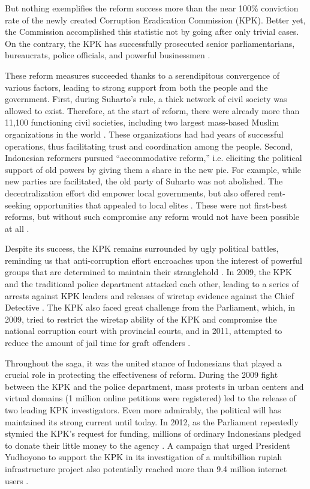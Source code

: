 \documentclass[12pt]{article}
\begin{document}
But nothing exemplifies the reform success more than the near 100\% conviction rate of the newly created Corruption Eradication Commission (KPK). Better yet, the Commission accomplished this statistic not by going after only trivial cases. On the contrary, the KPK has successfully prosecuted senior parliamentarians, bureaucrats, police officials, and powerful businessmen \citep{Schutte2012}.

These reform measures succeeded thanks to a serendipitous convergence of various factors, leading to strong support from both the people and the government. First, during Suharto's rule, a thick network of civil society was allowed to exist. Therefore, at the start of reform, there were already more than 11,100 functioning civil societies, including two largest mass-based Muslim organizations in the world \citep{Harris2011}. These organizations had had years of successful operations, thus facilitating trust and coordination among the people. Second, Indonesian reformers pursued ``accommodative reform,'' i.e. eliciting the political support of old powers by giving them a share in the new pie. For example, while new parties are facilitated, the old party of Suharto was not abolished. The decentralization effort did empower local governments, but also offered rent-seeking opportunities that appealed to local elites \citep{Hadiz2004}. These were not first-best reforms, but without such compromise any reform would not have been possible at all \citep{Harris2011}.

Despite its success, the KPK remains surrounded by ugly political battles, reminding us that anti-corruption effort encroaches upon the interest of powerful groups that are determined to maintain their stranglehold \citep{Kimura2011}. In 2009, the KPK and the traditional police department attacked each other, leading to a series of arrests against KPK leaders and releases of wiretap evidence against the Chief Detective \citep{Luebke2012}. The KPK also faced great challenge from the Parliament, which, in 2009, tried to restrict the wiretap ability of the KPK and compromise the national corruption court with provincial courts, and in 2011, attempted to reduce the amount of jail time for graft offenders \citep{TransparencyInternational2011}.

Throughout the saga, it was the united stance of Indonesians that played a crucial role in protecting the effectiveness of reform. During the 2009 fight between the KPK and the police department, mass protests in urban centers and virtual domains (1 million online petitions were registered) led to the release of two leading KPK investigators. Even more admirably, the political will has maintained its strong current until today. In 2012, as the Parliament repeatedly stymied the KPK's request for funding, millions of ordinary Indonesians pledged to donate their little money to the agency \citep{Jaaffar2012}. A campaign that urged President Yudhoyono to support the KPK in its investigation of a multibillion rupiah infrastructure project also potentially reached more than 9.4 million internet users \citep{Mahditama2012}.
\end{document}
